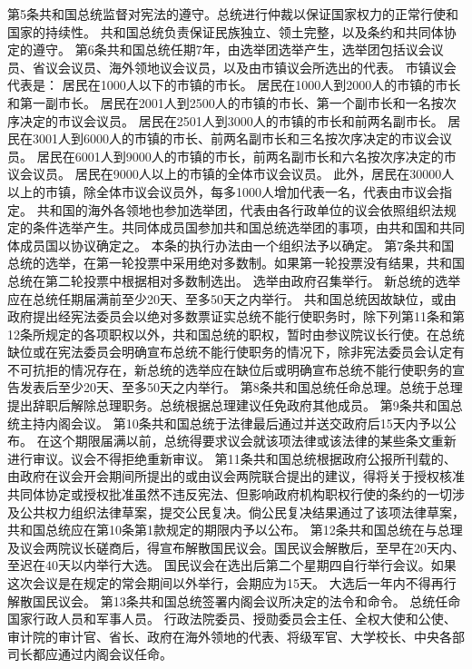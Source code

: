     第5条共和国总统监督对宪法的遵守。总统进行仲裁以保证国家权力的正常行使和国家的持续性。
    共和国总统负责保证民族独立、领土完整，以及条约和共同体协定的遵守。
    第6条共和国总统任期7年，由选举团选举产生，选举团包括议会议员、省议会议员、海外领地议会议员，以及由市镇议会所选出的代表。
    市镇议会代表是：
    居民在1000人以下的市镇的市长。
    居民在1000人到2000人的市镇的市长和第一副市长。
    居民在2001人到2500人的市镇的市长、第一个副市长和一名按次序决定的市议会议员。
    居民在2501人到3000人的市镇的市长和前两名副市长。
    居民在3001人到6000人的市镇的市长、前两名副市长和三名按次序决定的市议会议员。
    居民在6001人到9000人的市镇的市长，前两名副市长和六名按次序决定的市议会议员。
    居民在9000人以上的市镇的全体市议会议员。
    此外，居民在30000人以上的市镇，除全体市议会议员外，每多1000人增加代表一名，代表由市议会指定。
    共和国的海外各领地也参加选举团，代表由各行政单位的议会依照组织法规定的条件选举产生。共同体成员国参加共和国总统选举团的事项，由共和国和共同体成员国以协议确定之。
    本条的执行办法由一个组织法予以确定。
    第7条共和国总统的选举，在第一轮投票中采用绝对多数制。如果第一轮投票没有结果，共和国总统在第二轮投票中根据相对多数制选出。
    选举由政府召集举行。
    新总统的选举应在总统任期届满前至少20天、至多50天之内举行。
    共和国总统因故缺位，或由政府提出经宪法委员会以绝对多数票证实总统不能行使职务时，除下列第11条和第12条所规定的各项职权以外，共和国总统的职权，暂时由参议院议长行使。在总统缺位或在宪法委员会明确宣布总统不能行使职务的情况下，除非宪法委员会认定有不可抗拒的情况存在，新总统的选举应在缺位后或明确宣布总统不能行使职务的宣告发表后至少20天、至多50天之内举行。
    第8条共和国总统任命总理。总统于总理提出辞职后解除总理职务。总统根据总理建议任免政府其他成员。
    第9条共和国总统主持内阁会议。
    第10条共和国总统于法律最后通过并送交政府后15天内予以公布。
    在这个期限届满以前，总统得要求议会就该项法律或该法律的某些条文重新进行审议。议会不得拒绝重新审议。
    第11条共和国总统根据政府公报所刊载的、由政府在议会开会期间所提出的或由议会两院联合提出的建议，得将关于授权核准共同体协定或授权批准虽然不违反宪法、但影响政府机构职权行使的条约的一切涉及公共权力组织法律草案，提交公民复决。倘公民复决结果通过了该项法律草案，共和国总统应在第10条第1款规定的期限内予以公布。
    第12条共和国总统在与总理及议会两院议长磋商后，得宣布解散国民议会。国民议会解散后，至早在20天内、至迟在40天以内举行大选。
    国民议会在选出后第二个星期四自行举行会议。如果这次会议是在规定的常会期间以外举行，会期应为15天。
    大选后一年内不得再行解散国民议会。
    第13条共和国总统签署内阁会议所决定的法令和命令。
    总统任命国家行政人员和军事人员。
    行政法院委员、授勋委员会主任、全权大使和公使、审计院的审计官、省长、政府在海外领地的代表、将级军官、大学校长、中央各部司长都应通过内阁会议任命。
